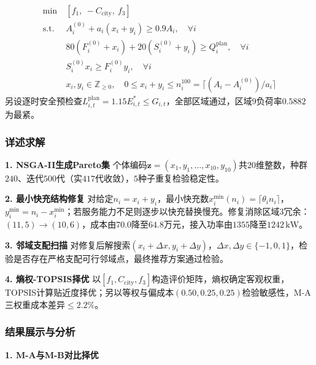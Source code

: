 \documentclass[a4paper,12pt]{ctexart}
\begin{document}
\begin{equation}
\begin{aligned}
\min\ & [f_{1},\ -C_{\mathrm{city}},\ f_{3}] \\
\mathrm{s.t.}\ & A_{i}^{(0)}+a_{i}(x_{i}+y_{i})\ge0.9A_{i},\quad\forall i \\
& 80(F_{i}^{(0)}+x_{i})+20(S_{i}^{(0)}+y_{i})\ge Q_{i}^{\mathrm{plan}},\quad\forall i \\
& S_{i}^{(0)}x_{i}\ge F_{i}^{(0)}y_{i},\quad\forall i \\
& x_{i},y_{i}\in\mathbb{Z}_{\ge0},\quad 0\le x_{i}+y_{i}\le n_{i}^{100}=\lceil(A_{i}-A_{i}^{(0)})/a_{i}\rceil
\end{aligned}\tag{2-7}
\end{equation}
另设逐时安全预检查$L_{i,t}^{\mathrm{plan}}=1.15E_{i,t}^{*}\le G_{i,t}$，全部区域通过，区域$9$负荷率$0.5882$为最紧。

\subsubsection{详述求解}

\textbf{1. NSGA-II生成Pareto集} 个体编码$\mathbf{z}=(x_{1},y_{1},\ldots,x_{10},y_{10})$共$20$维整数，种群$240$、迭代$500$代（实$417$代收敛），$5$种子重复检验稳定性。


\textbf{2. 最小快充结构修复} 对给定$n_{i}=x_{i}+y_{i}$，最小快充数$x_{i}^{\min}(n_{i})=\lceil\theta_{i}n_{i}\rceil$，$y_{i}^{\min}=n_{i}-x_{i}^{\min}$；若服务能力不足则逐步以快充替换慢充。修复消除区域$3$冗余：$(11,5)\to(10,6)$，成本由$70.0$降至$64.8$万元，接入功率由$1355$降至$1242\,\mathrm{kW}$。

\textbf{3. 邻域支配扫描} 对修复后解搜索$(x_{i}+\Delta x,y_{i}+\Delta y)$，$\Delta x,\Delta y\in\{-1,0,1\}$，检验是否存在严格支配可行邻域点，最终推荐方案通过检验。

\textbf{4. 熵权-TOPSIS择优} 以$[f_{1},C_{\mathrm{city}},f_{3}]$构造评价矩阵，熵权确定客观权重，TOPSIS计算贴近度择优；另以等权与偏成本$(0.50,0.25,0.25)$检验敏感性，M-A三权重成本差异$\le2.2\%$。


\subsubsection{结果展示与分析}

\textbf{1. M-A与M-B对比择优}
\end{document}
